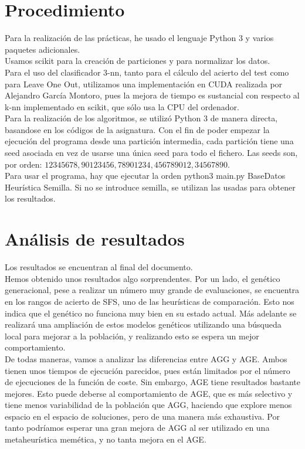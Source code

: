 \section{Procedimiento}
Para la realización de las prácticas, he usado el lenguaje Python 3 y varios paquetes adicionales.\\

Usamos scikit para la creación de particiones y para normalizar los datos.\\

Para el uso del clasificador 3-nn, tanto para el cálculo del acierto del test  como para Leave One Out, utilizamos una implementación en CUDA realizada por Alejandro García Montoro, pues la mejora de tiempo es sustancial con respecto al k-nn implementado en scikit, que sólo usa la CPU del ordenador.\\

Para la realización de los algoritmos, se utilizó Python 3 de manera directa, basandose en los códigos de la asignatura. Con el fin de poder empezar la ejecución del programa desde una partición intermedia, cada partición tiene una seed asociada en vez de usarse una única seed para todo el fichero. Las seeds son, por orden: $12345678,90123456,78901234,456789012,34567890$. \\

Para usar el programa, hay que ejecutar la orden  python3 main.py BaseDatos Heurística Semilla. Si no se introduce semilla, se utilizan las usadas para obtener los resultados.
\newpage
\section{Análisis de resultados}

Los resultados se encuentran al final del documento.\\

Hemos obtenido unos resultados algo sorprendentes. Por un lado, el genético generacional, pese a realizar un número muy grande de evaluaciones, se encuentra en los rangos de acierto de SFS, uno de las heurísticas de comparación. Esto nos indica que el genético no funciona muy bien en su estado actual. Más adelante se realizará una ampliación de estos modelos genéticos utilizando una búsqueda local para mejorar a la población, y realizando esto se espera un mejor comportamiento.\\

De todas maneras, vamos a analizar las diferencias entre AGG y AGE. Ambos tienen unos tiempos de ejecución parecidos, pues están limitados por el número de ejecuciones de la función de coste. Sin embargo, AGE tiene resultados bastante mejores. Esto puede deberse al comportamiento de AGE, que es más selectivo y tiene menos variabilidad de la población que AGG, haciendo que explore menos espacio en el espacio de soluciones, pero de una manera más exhaustiva. Por tanto podríamos esperar una gran mejora de AGG al ser utilizado en una metaheurística memética, y no tanta mejora en el AGE.\\

